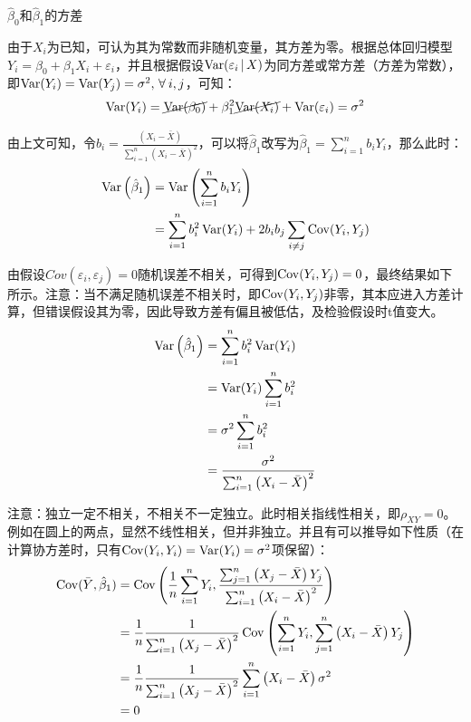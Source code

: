 \documentclass[11pt]{article}
\begin{document}
\begin{property}
    $\hat{\beta}_0$和$\hat{\beta}_1$的方差

    由于$X_i$为已知，可认为其为常数而非随机变量，其方差为零。根据总体回归模型$Y_i = \beta_0 + \beta_1 X_i + \varepsilon_i$，并且根据假设$\operatorname{Var}(\varepsilon_i \,\vert\, X)$为同方差或常方差（方差为常数），即$\Var(Y_i) = \Var(Y_j) = \sigma^2 \ilsep \forall i,j$，可知：
    \begin{equation*}
        \operatorname{Var}(Y_i) = \cancel{\operatorname{Var}(\beta_0)} + \beta_1^2 \cancel{\operatorname{Var}(X_i)} + \operatorname{Var}(\varepsilon_i) = \sigma^2
    \end{equation*}

    由上文可知，令$b_i = \frac{\left(X_i - \bar{X}\right)}{\sum_{i=1}^{n} \left(X_i - \bar{X}\right)^2}$，可以将$\hat{\beta}_1$改写为$\hat{\beta}_1 = \sum_{i=1}^{n} b_i Y_i$，那么此时：
    \begin{align*}
        \operatorname{Var}\left(\hat{\beta}_1\right) &= \operatorname{Var}\left( \sum_{i=1}^{n} b_i Y_i \right) \\
        &= \sum_{i=1}^{n} b_i^2 \operatorname{Var}(Y_i) + 2b_i b_j \sum_{i\neq j} \operatorname{Cov}(Y_i,Y_j)
    \end{align*}

    由假设$Cov(\varepsilon_i,\varepsilon_j)=0$随机误差不相关，可得到$\operatorname{Cov}(Y_i,Y_j)=0$，最终结果如下所示。注意：当不满足随机误差不相关时，即$\operatorname{Cov}(Y_i,Y_j)$非零，其本应进入方差计算，但错误假设其为零，因此导致方差有偏且被低估，及检验假设时t值变大。
    \begin{align*}
        \operatorname{Var}\left(\hat{\beta}_1\right)
        &= \sum_{i=1}^{n} b_i^2 \operatorname{Var}(Y_i) \\
        &= \operatorname{Var}(Y_i) \sum_{i=1}^{n} b_i^2 \\
        &= \sigma^2 \sum_{i=1}^{n} b_i^2 \\
        &= \frac{\sigma^2}{\sum_{i=1}^{n} \left(X_i - \bar{X}\right)^2}
    \end{align*}

    注意：独立一定不相关，不相关不一定独立。此时相关指线性相关，即$\rho_{XY}=0$。例如在圆上的两点，显然不线性相关，但并非独立。并且有可以推导如下性质（在计算协方差时，只有$\operatorname{Cov}(Y_i,Y_i)=\operatorname{Var}(Y_i)=\sigma^2$项保留）：
    \begin{align*}
        \operatorname{Cov}(\bar{Y},\hat{\beta}_1)
        &= \operatorname{Cov} \left( \frac{1}{n} \sum_{i=1}^{n} Y_i, \frac{\sum_{j=1}^{n} \left(X_j - \bar{X}\right) Y_j}{\sum_{i=1}^{n} \left(X_i - \bar{X}\right)^2} \right) \\
        &= \frac{1}{n} \frac{1}{\sum_{i=1}^{n} \left(X_j - \bar{X}\right)^2} \operatorname{Cov} \left( \sum_{i=1}^{n} Y_i, \sum_{j=1}^{n} \left(X_i - \bar{X}\right) Y_j \right) \\
        &= \frac{1}{n} \frac{1}{\sum_{i=1}^{n} \left(X_j - \bar{X}\right)^2} \sum_{i=1}^{n} \left(X_i - \bar{X}\right) \sigma^2 \\
        &= 0
    \end{align*}


\end{property}
\end{document}
